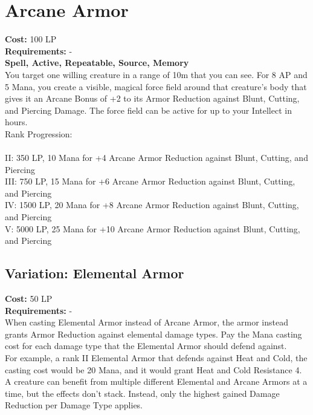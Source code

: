 \section{Arcane Armor}\label{spell:arcaneArmor}
\textbf{Cost:} 100 LP\\
\textbf{Requirements:} -\\
\textbf{Spell, Active, Repeatable, Source, Memory}\\
You target one willing creature in a range of 10m that you can see.
For 8 AP and 5 Mana, you create a visible, magical force field around that creature's body that gives it an Arcane Bonus of +2 to its Armor Reduction against Blunt, Cutting, and Piercing Damage.
The force field can be active for up to your Intellect in hours.
\\
Rank Progression:\\
\\
II: 350 LP, 10 Mana for +4 Arcane Armor Reduction against Blunt, Cutting, and Piercing\\
III: 750 LP, 15 Mana for +6 Arcane Armor Reduction against Blunt, Cutting, and Piercing\\
IV: 1500 LP, 20 Mana for +8 Arcane Armor Reduction against Blunt, Cutting, and Piercing\\
V: 5000 LP, 25 Mana for +10 Arcane Armor Reduction against Blunt, Cutting, and Piercing\\

\subsection{Variation: Elemental Armor}\label{spell:elementalArmor}
\textbf{Cost:} 50 LP\\
\textbf{Requirements:} -\\
When casting Elemental Armor instead of Arcane Armor, the armor instead grants Armor Reduction against elemental damage types.
Pay the Mana casting cost for each damage type that the Elemental Armor should defend against.\\
For example, a rank II Elemental Armor that defends against Heat and Cold, the casting cost would be 20 Mana, and it would grant Heat and Cold Resistance 4.\\
A creature can benefit from multiple different Elemental and Arcane Armors at a time, but the effects don't stack.
Instead, only the highest gained Damage Reduction per Damage Type applies.